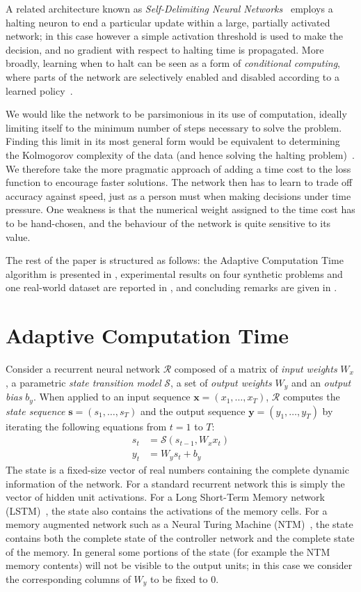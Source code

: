 \documentclass[10pt]{article}
\newcommand{\vect}[1]{\mathbf{#1}}
\newcommand{\rnn}{\mathcal{R}}
\newcommand{\inseq}{\vect{x}}
\newcommand{\stateseq}{\vect{s}}
\newcommand{\outseq}{\vect{y}}
\newcommand{\statef}{\mathcal{S}}
\newcommand{\seclabel}[1]{\label{sec:#1}}
\newcommand{\sref}[1]{\Cref{sec:#1}}
\begin{document}
A related architecture known as \emph{Self-Delimiting Neural Networks}~\cite{schmidhuber2012self,srivastava2013first} employs a halting neuron to end a particular update within a large, partially activated network; in this case however a simple activation threshold is used to make the decision, and no gradient with respect to halting time is propagated.
More broadly, learning when to halt can be seen as a form of \emph{conditional computing}, where parts of the network are selectively enabled and disabled according to a learned policy~\cite{bengio2015conditional,denoyer2014deep}.

We would like the network to be parsimonious in its use of computation, ideally limiting itself to the minimum number of steps necessary to solve the problem.
Finding this limit in its most general form would be equivalent to determining the Kolmogorov complexity of the data (and hence solving the halting problem)~\cite{li2013introduction}.
We therefore take the more pragmatic approach of adding a time cost to the loss function to encourage faster solutions.
The network then has to learn to trade off accuracy against speed, just as a person must when making decisions under time pressure.
One weakness is that the numerical weight assigned to the time cost has to be hand-chosen, and the behaviour of the network is quite sensitive to its value.

The rest of the paper is structured as follows: the Adaptive Computation Time algorithm is presented in \sref{act}, experimental results on four synthetic problems and one real-world dataset are reported in \sref{results}, and concluding remarks are given in \sref{conclusion}.

\section{Adaptive Computation Time}\seclabel{act}
Consider a recurrent neural network $\rnn$ composed of a matrix of \emph{input weights} $W_x$, a parametric \emph{state transition model} $\statef$, a set of \emph{output weights} $W_y$ and an \emph{output bias} $b_y$. 
When applied to an input sequence $\inseq = (x_1,\ldots,x_T)$, $\rnn$ computes the \emph{state sequence} $\stateseq = (s_1,\ldots,s_T)$ and the output sequence $\outseq = (y_1,\ldots,y_T)$ by iterating the following equations from $t=1$ to $T$:
\begin{align}
s_t &= \statef(s_{t-1}, W_x x_t)\\
y_t &= W_y s_t + b_y
\end{align} 
The state is a fixed-size vector of real numbers containing the complete dynamic information of the network.
For a standard recurrent network this is simply the vector of hidden unit activations.
For a Long Short-Term Memory network (LSTM)~\cite{hochreiter1997lstm}, the state also contains the activations of the memory cells.
For a memory augmented network such as a Neural Turing Machine (NTM)~\cite{graves2014ntm}, the state contains both the complete state of the controller network and the complete state of the memory.
In general some portions of the state (for example the NTM memory contents) will not be visible to the output units; in this case we consider the corresponding columns of $W_y$ to be fixed to 0.
\end{document}

